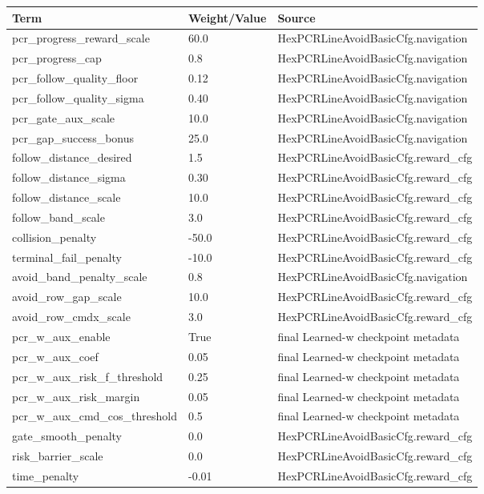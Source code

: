 \begin{tabular}{lll}
\toprule
Term & Weight/Value & Source \\
\midrule
pcr\_progress\_reward\_scale & 60.0 & HexPCRLineAvoidBasicCfg.navigation \\
pcr\_progress\_cap & 0.8 & HexPCRLineAvoidBasicCfg.navigation \\
pcr\_follow\_quality\_floor & 0.12 & HexPCRLineAvoidBasicCfg.navigation \\
pcr\_follow\_quality\_sigma & 0.40 & HexPCRLineAvoidBasicCfg.navigation \\
pcr\_gate\_aux\_scale & 10.0 & HexPCRLineAvoidBasicCfg.navigation \\
pcr\_gap\_success\_bonus & 25.0 & HexPCRLineAvoidBasicCfg.navigation \\
follow\_distance\_desired & 1.5 & HexPCRLineAvoidBasicCfg.reward\_cfg \\
follow\_distance\_sigma & 0.30 & HexPCRLineAvoidBasicCfg.reward\_cfg \\
follow\_distance\_scale & 10.0 & HexPCRLineAvoidBasicCfg.reward\_cfg \\
follow\_band\_scale & 3.0 & HexPCRLineAvoidBasicCfg.reward\_cfg \\
collision\_penalty & -50.0 & HexPCRLineAvoidBasicCfg.reward\_cfg \\
terminal\_fail\_penalty & -10.0 & HexPCRLineAvoidBasicCfg.reward\_cfg \\
avoid\_band\_penalty\_scale & 0.8 & HexPCRLineAvoidBasicCfg.navigation \\
avoid\_row\_gap\_scale & 10.0 & HexPCRLineAvoidBasicCfg.reward\_cfg \\
avoid\_row\_cmdx\_scale & 3.0 & HexPCRLineAvoidBasicCfg.reward\_cfg \\
pcr\_w\_aux\_enable & True & final Learned-w checkpoint metadata \\
pcr\_w\_aux\_coef & 0.05 & final Learned-w checkpoint metadata \\
pcr\_w\_aux\_risk\_f\_threshold & 0.25 & final Learned-w checkpoint metadata \\
pcr\_w\_aux\_risk\_margin & 0.05 & final Learned-w checkpoint metadata \\
pcr\_w\_aux\_cmd\_cos\_threshold & 0.5 & final Learned-w checkpoint metadata \\
gate\_smooth\_penalty & 0.0 & HexPCRLineAvoidBasicCfg.reward\_cfg \\
risk\_barrier\_scale & 0.0 & HexPCRLineAvoidBasicCfg.reward\_cfg \\
time\_penalty & -0.01 & HexPCRLineAvoidBasicCfg.reward\_cfg \\
\bottomrule
\end{tabular}
